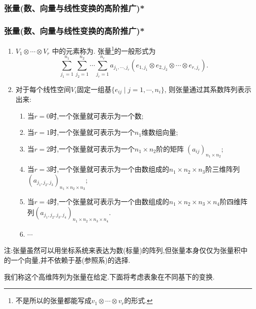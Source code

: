\subsubsection{张量(数、向量与线性变换的高阶推广)*}
\begin{frame}\frametitle{张量(数、向量与线性变换的高阶推广)*}
\begin{enumerate}
\item $V_1\otimes \cdots \otimes V_r$ 中的元素称为. \pp 张量\footnote{不是所以的张量都能写成$v_1\otimes \cdots \otimes v_r$的形式.}的一般形式为
\[\sum_{j_1=1}^{n_1}\sum_{j_2=1}^{n_2}\cdots \sum_{j_r=1}^{n_r} a_{j_1,\cdots,j_r} \left( e_{1,j_1}\otimes e_{2,j_2} \otimes \cdots \otimes e_{r,j_r}\right).\] \pp
\item 对于每个线性空间$V_i$固定一组基$\{e_{ij}\mid j=1,\cdots,n_i\}$, 则张量通过其系数阵列表示出来: \pp
\begin{enumerate}
\item 当$r=0$时,一个张量就可表示为一个数; \pp
\item 当$r=1$时,一个张量就可表示为一个$n_1$维数组向量; \pp
\item 当$r=2$时,一个张量就可表示为一个$n_1\times n_2$阶的矩阵 $(a_{ij})_{n_1\times n_2}$; \pp
\item 当$r=3$时,一个张量就可表示为一个由数组成的$n_1\times n_2\times n_3$阶三维阵列$(a_{j_1,j_2,j_3})_{n_1\times n_2\times n_3}$;\pp
\item 当$r=4$时,一个张量就可表示为一个由数组成的$n_1\times n_2\times n_3\times n_4$阶四维阵列$(a_{j_1,j_2,j_3,j_4})_{n_1\times n_2\times n_3\times n_4}$.\pp
\item $\cdots$
\end{enumerate}
\end{enumerate}
\pp
注:张量虽然可以用坐标系统来表达为数(标量)的阵列,但张量本身仅仅为张量积中的一个向量,并不依赖于基(参照系)的选择.\\
\pp

我们称这个高维阵列为张量在给定.下面将考虑表象在不同基下的变换.
\end{frame}





